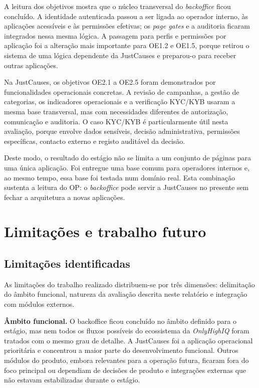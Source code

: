 A leitura dos objetivos mostra que o núcleo transversal do \textit{backoffice} ficou concluído. A identidade autenticada passou a ser ligada ao operador interno, às aplicações acessíveis e às permissões efetivas; os \textit{page gates} e a auditoria ficaram integrados nessa mesma lógica. A passagem para perfis e permissões por aplicação foi a alteração mais importante para OE1.2 e OE1.5, porque retirou o sistema de uma lógica dependente da JustCauses e preparou-o para receber outras aplicações.

Na JustCauses, os objetivos OE2.1 a OE2.5 foram demonstrados por funcionalidades operacionais concretas. A revisão de campanhas, a gestão de categorias, os indicadores operacionais e a verificação \gls{KYC}/\gls{KYB} usaram a mesma base transversal, mas com necessidades diferentes de autorização, comunicação e auditoria. O caso \gls{KYC}/\gls{KYB} é particularmente útil nesta avaliação, porque envolve dados sensíveis, decisão administrativa, permissões específicas, contacto externo e registo auditável da decisão.

Deste modo, o resultado do estágio não se limita a um conjunto de páginas para uma única aplicação. Foi entregue uma base comum para operadores internos e, ao mesmo tempo, essa base foi testada num domínio real. Esta combinação sustenta a leitura do OP: o \textit{backoffice} pode servir a JustCauses no presente sem fechar a arquitetura a novas aplicações.


\section{Limitações e trabalho futuro}
\label{sec:limitacoes_trabalho_futuro}

\subsection{Limitações identificadas}
\label{subsec:limitacoes}

As limitações do trabalho realizado distribuem-se por três dimensões: delimitação do âmbito funcional, natureza da avaliação descrita neste relatório e integração com módulos externos.

\textbf{Âmbito funcional.} O backoffice ficou concluído no âmbito definido para o estágio, mas nem todos os fluxos possíveis do ecossistema da \textit{OnlyHighIQ} foram tratados com o mesmo grau de detalhe. A JustCauses foi a aplicação operacional prioritária e concentrou a maior parte do desenvolvimento funcional. Outros módulos do produto, embora relevantes para a operação futura, ficaram fora do foco principal ou dependiam de decisões de produto e integrações externas que não estavam estabilizadas durante o estágio.

